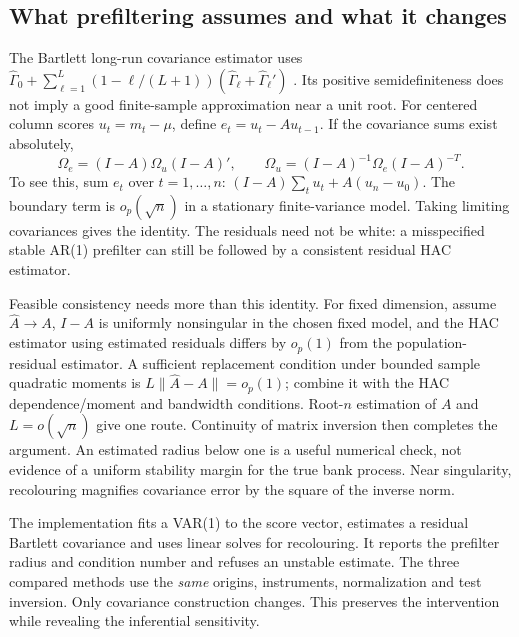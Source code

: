 \subsection{What prefiltering assumes and what it changes}
The Bartlett long-run covariance estimator uses
$\hat\Gamma_0+\sum_{\ell=1}^L(1-\ell/(L+1))
(\hat\Gamma_\ell+\hat\Gamma_\ell')$ \citep{newey1986}. Its positive
semidefiniteness does not imply a good finite-sample approximation near a
unit root. For centered column scores $u_t=m_t-\mu$, define
$e_t=u_t-Au_{t-1}$. If the covariance sums exist absolutely,
\[
 \Omega_e=(I-A)\Omega_u(I-A)',\qquad
 \Omega_u=(I-A)^{-1}\Omega_e(I-A)^{-T}.
\]
To see this, sum $e_t$ over $t=1,\ldots,n$:
$(I-A)\sum_tu_t+A(u_n-u_0)$. The boundary term is $o_p(\sqrt n)$ in a
stationary finite-variance model. Taking limiting covariances gives the
identity. The residuals need not be white: a misspecified stable AR(1)
prefilter can still be followed by a consistent residual HAC estimator.

Feasible consistency needs more than this identity. For fixed dimension,
assume $\hat A\to A$, $I-A$ is uniformly nonsingular in the chosen fixed
model, and the HAC estimator using estimated residuals differs by $o_p(1)$
from the population-residual estimator. A sufficient replacement condition
under bounded sample quadratic moments is
$L\|\hat A-A\|=o_p(1)$; combine it with the HAC dependence/moment and
bandwidth conditions. Root-$n$ estimation of $A$ and $L=o(\sqrt n)$ give
one route. Continuity of matrix inversion then completes the argument.
An estimated radius below one is a useful numerical check, not evidence
of a uniform stability margin for the true bank process. Near singularity,
recolouring magnifies covariance error by the square of the inverse norm.

The implementation fits a VAR(1) to the score vector, estimates a residual
Bartlett covariance and uses linear solves for recolouring. It reports the
prefilter radius and condition number and refuses an unstable estimate.
The three compared methods use the \emph{same} origins, instruments,
normalization and test inversion. Only covariance construction changes.
This preserves the intervention while revealing the inferential sensitivity.

